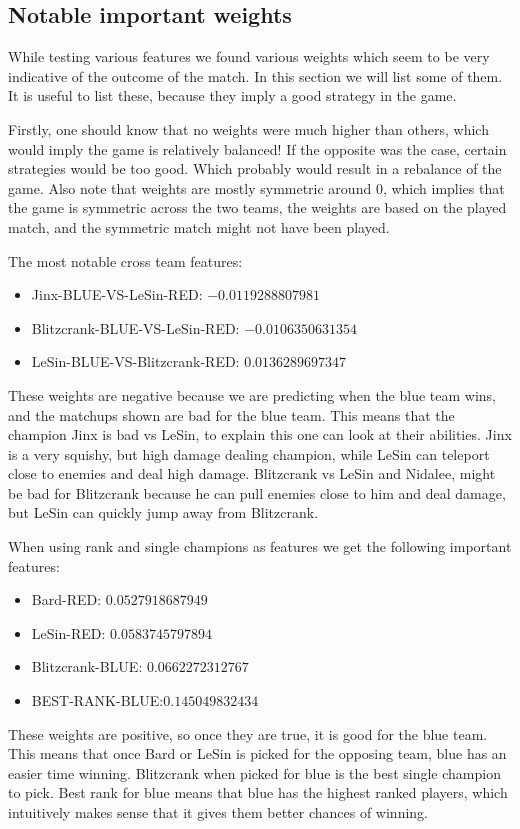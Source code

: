 \subsection{Notable important weights} %
\label{sub:important_weights}

While testing various features we found various weights which seem to be very indicative of the outcome of the match. In this section we will list some of them. It is useful to list these, because they imply a good strategy in the game.

Firstly, one should know that no weights were much higher than others, which would imply the game is relatively balanced! If the opposite was the case, certain strategies would be too good. Which probably would result in a rebalance of the game. Also note that weights are mostly symmetric around 0, which implies that the game is symmetric across the two teams, the weights are based on the played match, and the symmetric match might not have been played.

The most notable cross team features:
\begin{itemize}
    \item Jinx-BLUE-VS-LeSin-RED: $-0.0119288807981$
    \item Blitzcrank-BLUE-VS-LeSin-RED: $-0.0106350631354$
    \item LeSin-BLUE-VS-Blitzcrank-RED: $0.0136289697347$
\end{itemize}
These weights are negative because we are predicting when the blue team wins, and the matchups shown are bad for the blue team. This means that the champion Jinx is bad vs LeSin, to explain this one can look at their abilities. Jinx is a very squishy, but high damage dealing champion, while LeSin can teleport close to enemies and deal high damage. Blitzcrank vs LeSin and Nidalee, might be bad for Blitzcrank because he can pull enemies close to him and deal damage, but LeSin can quickly jump away from Blitzcrank.

When using rank and single champions as features we get the following important features:

\begin{itemize}
    \item Bard-RED: $0.0527918687949$
    \item LeSin-RED: $0.0583745797894$
    \item Blitzcrank-BLUE: $0.0662272312767$
    \item BEST-RANK-BLUE:$ 0.145049832434$
\end{itemize}

These weights are positive, so once they are true, it is good for the blue team. This means that once Bard or LeSin is picked for the opposing team, blue has an easier time winning. Blitzcrank when picked for blue is the best single champion to pick. Best rank for blue means that blue has the highest ranked players, which intuitively makes sense that it gives them better chances of winning.

